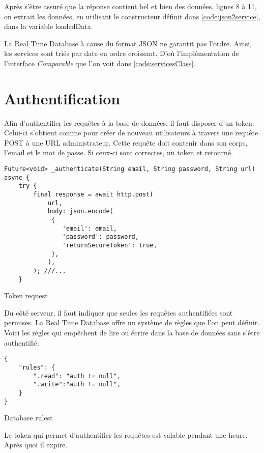 Après s'être assuré que la réponse contient bel et bien des données, lignes 8 à 11, on extrait les données, en utilisant le constructeur définit dans \autoref{code:json2service}, dans la variable loadedData. 

La Real Time Database à cause du format JSON ne garantit pas l'ordre. Ainsi, les services sont triés par date en ordre croissant. D'où l'implémentation de l'interface \textit{Comparable} que l'on voit dans \autoref{code:servicesClass}.


\newpage
\section{Authentification}
Afin d'authentifier les requêtes à la base de données, il faut disposer d'un token. Celui-ci s'obtient comme pour créer de nouveau utilisateurs à travers une requête POST à une URL administrateur. Cette requête doit contenir dans son corps, l'email et le mot de passe. Si ceux-ci sont correctes, un token et retourné. 
\begin{listing}[!h]
    \begin{verbatim}
Future<void> _authenticate(String email, String password, String url) async {
    try {
        final response = await http.post(
            url,
            body: json.encode(
             {
                'email': email,
                'password': password,
                'returnSecureToken': true,
             },
            ),
        ); ///...
    }
    \end{verbatim}
    \caption{Token request}
    \label{code:authenticate}
    \end{listing}
Du côté serveur, il faut indiquer que seules les requêtes authentifiées sont permises. La Real Time Database offre un système de règles que l'on peut définir. Voici les règles qui empêchent de lire ou écrire dans la base de données sans s'être authentifié:

\begin{listing}[!h]
    \begin{verbatim}
{
    "rules": {
        ".read": "auth != null",
        ".write":"auth != null",
    }
}
    \end{verbatim}
    \caption{Database rulest}
    \label{code:rules}
    \end{listing}

Le token qui permet d'authentifier les requêtes est valable pendant une heure. Après quoi il expire.

